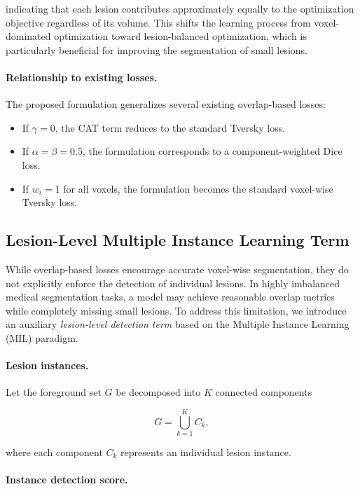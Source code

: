 indicating that each lesion contributes approximately equally to the
optimization objective regardless of its volume. This shifts the learning
process from voxel-dominated optimization toward lesion-balanced
optimization, which is particularly beneficial for improving the
segmentation of small lesions.

\paragraph{Relationship to existing losses.}
The proposed formulation generalizes several existing overlap-based losses:

\begin{itemize}
\item If $\gamma = 0$, the CAT term reduces to the standard Tversky loss.
\item If $\alpha = \beta = 0.5$, the formulation corresponds to a component-weighted Dice loss.
\item If $w_i = 1$ for all voxels, the formulation becomes the standard voxel-wise Tversky loss.
\end{itemize}

\subsection{Lesion-Level Multiple Instance Learning Term}

While overlap-based losses encourage accurate voxel-wise segmentation,
they do not explicitly enforce the detection of individual lesions.
In highly imbalanced medical segmentation tasks, a model may achieve
reasonable overlap metrics while completely missing small lesions.
To address this limitation, we introduce an auxiliary
\emph{lesion-level detection term} based on the Multiple Instance
Learning (MIL) paradigm.

\paragraph{Lesion instances.}

Let the foreground set $G$ be decomposed into $K$ connected components

\[
G = \bigcup_{k=1}^{K} C_k,
\]

where each component $C_k$ represents an individual lesion instance.

\paragraph{Instance detection score.}


